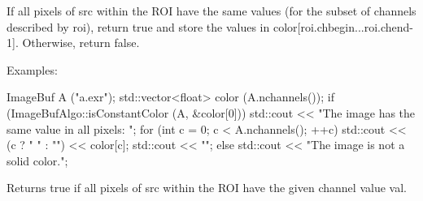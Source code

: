  

If all pixels of {\cf src} within the ROI have the same values (for the
subset of channels described by {\cf roi}), return {\cf true} and store
the values in {\cf color[roi.chbegin...roi.chend-1]}.  Otherwise, return
{\cf false}.

\smallskip
\noindent Examples:
\begin{code}
    ImageBuf A ("a.exr");
    std::vector<float> color (A.nchannels());
    if (ImageBufAlgo::isConstantColor (A, &color[0])) {
        std::cout << "The image has the same value in all pixels: ";
        for (int c = 0;  c < A.nchannels();  ++c)
            std::cout << (c ? " " : "") << color[c];
        std::cout << "\n";
    } else {
        std::cout << "The image is not a solid color.\n";
    }
\end{code}
\apiend

\begin{comment}
\apiitem{bool {\ce isConstantValue} (const ImageBuf \&src, const float *color, \\
 \bigspc\bigspc         ROI roi=ROI::All(), nthreads=0)}
\index{ImageBufAlgo!isConstantValue} \indexapi{isConstantValue}

Returns {\cf true} if all pixels of {\cf src} within the ROI have the
values given by \\ {\cf color[roi.chbegin...roi.chend-1]}.

\smallskip
\noindent Examples:
\begin{code}
    ImageBuf A ("a.exr");
    float testcolor[3] = { 1, 0, 0 };
    ROI roi = get_roi (A.spec());
    roi.chend = std::min (3, roi.chend);  // only test RGB, not alpha
    if (ImageBufAlgo::isConstantValue (A, testcolor)) {
        std::cout << "The image is solid red everywhere\n";
    } else {
        std::cout << "The image is not solid red\n";
    }
\end{code}
\apiend
\end{comment}


 

Returns {\cf true} if all pixels of {\cf src} within the ROI have the
given {\cf channel} value {\cf val}.

